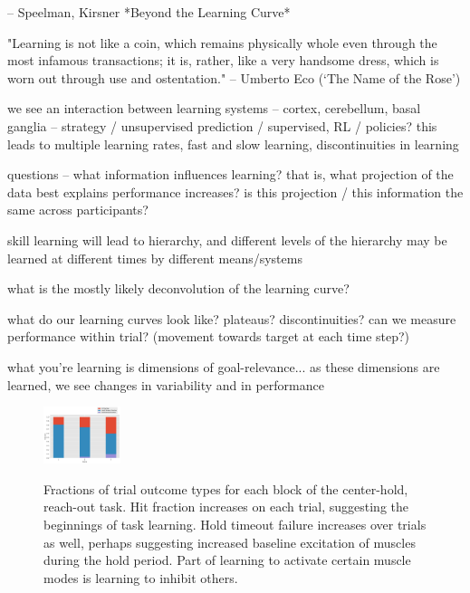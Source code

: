 \documentclass[../main.tex]{subfiles}
\begin{document}
-- Speelman, Kirsner *Beyond the Learning Curve*

"Learning is not like a coin, which remains physically whole even through the most
infamous transactions; it is, rather, like a very handsome dress, which is worn out
through use and ostentation."
-- Umberto Eco (‘The Name of the Rose’)



we see an interaction between learning systems -- cortex, cerebellum, basal ganglia -- strategy / unsupervised prediction / supervised, RL / policies?
this leads to multiple learning rates, fast and slow learning, discontinuities in learning

questions -- what information influences learning?
that is, what projection of the data best explains performance increases?
is this projection / this information the same across participants?

skill learning will lead to hierarchy, and different levels of the hierarchy may be learned at different times by different means/systems

what is the mostly likely deconvolution of the learning curve?

what do our learning curves look like? plateaus? discontinuities?
can we measure performance within trial? (movement towards target at each time step?)

what you're learning is dimensions of goal-relevance... as these dimensions are learned, we see changes in variability and in performance



\begin{figure}
    \label{fig:hit_fraction}
    \centering
    \includegraphics[width=0.2\textwidth]{images/data_analysis/center_hold/hit_fraction.pdf}
    \caption{Fractions of trial outcome types for each block of the center-hold, reach-out task. Hit fraction increases on each trial, suggesting the beginnings of task learning. Hold timeout failure increases over trials as well, perhaps suggesting increased baseline excitation of muscles during the hold period. Part of learning to activate certain muscle modes is learning to inhibit others.}\label{fig:hit_fraction}
    \end{figure}
\end{document}
